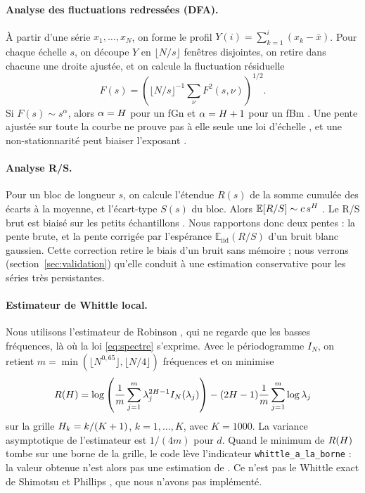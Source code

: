 \paragraph{Analyse des fluctuations redressées (DFA).}
À partir d'une série $x_1, \dots, x_N$, on forme le profil $Y(i) = \sum_{k=1}^i (x_k - \bar{x})$. Pour chaque échelle $s$, on découpe $Y$ en $\lfloor N/s \rfloor$ fenêtres disjointes, on retire dans chacune une droite ajustée, et on calcule la fluctuation résiduelle
\begin{equation}
F(s) = \left(\lfloor N/s \rfloor^{-1} \sum_{\nu} F^2(s, \nu)\right)^{1/2}.
\end{equation}
Si $F(s) \sim s^\alpha$, alors $\alpha = H$ pour un fGn et $\alpha = H + 1$ pour un fBm \cite{peng1994}. Une pente ajustée sur toute la courbe ne prouve pas à elle seule une loi d'échelle \cite{maraun2004}, et une non-stationnarité peut biaiser l'exposant \cite{brillinger1994}.

\paragraph{Analyse R/S.}
Pour un bloc de longueur $s$, on calcule l'étendue $R(s)$ de la somme cumulée des écarts à la moyenne, et l'écart-type $S(s)$ du bloc. Alors $\mathbb{E}[R/S] \sim c\, s^H$ \cite{hurst1951,mandelbrot1968}. Le R/S brut est biaisé sur les petits échantillons \cite{anis1976,peters1994}. Nous rapportons donc deux pentes : la pente brute, et la pente corrigée par l'espérance $\mathbb{E}_{\text{iid}}(R/S)$ d'un bruit blanc gaussien. Cette correction retire le biais d'un bruit sans mémoire ; nous verrons (section~\ref{sec:validation}) qu'elle conduit à une estimation conservative pour les séries très persistantes.

\paragraph{Estimateur de Whittle local.}
Nous utilisons l'estimateur de Robinson \cite{robinson1995}, qui ne regarde que les basses fréquences, là où la loi \eqref{eq:spectre} s'exprime. Avec le périodogramme $I_N$, on retient $m = \min(\lfloor N^{0,65} \rfloor, \lfloor N/4 \rfloor)$ fréquences et on minimise
\begin{equation}
R(H) = \log\left(\frac{1}{m}\sum_{j=1}^{m} \lambda_j^{2H-1} I_N(\lambda_j)\right) - (2H-1)\frac{1}{m}\sum_{j=1}^{m} \log \lambda_j
\label{eq:whittle}
\end{equation}
sur la grille $H_k = k/(K+1)$, $k = 1, \dots, K$, avec $K = 1000$. La variance asymptotique de l'estimateur est $1/(4m)$ pour $d$. Quand le minimum de $R(H)$ tombe sur une borne de la grille, le code lève l'indicateur \texttt{whittle\_a\_la\_borne} : la valeur obtenue n'est alors pas une estimation de \Hurst. Ce n'est pas le Whittle exact de Shimotsu et Phillips \cite{shimotsu2005}, que nous n'avons pas implémenté.

